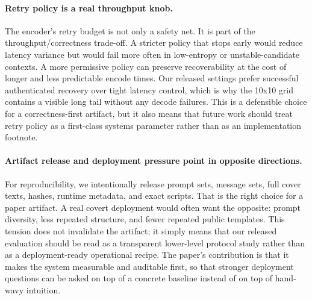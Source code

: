 \paragraph{Retry policy is a real throughput knob.} The encoder's retry budget is not only a safety net. It is part of the throughput/correctness trade-off. A stricter policy that stops early would reduce latency variance but would fail more often in low-entropy or unstable-candidate contexts. A more permissive policy can preserve recoverability at the cost of longer and less predictable encode times. Our released settings prefer successful authenticated recovery over tight latency control, which is why the 10x10 grid contains a visible long tail without any decode failures. This is a defensible choice for a correctness-first artifact, but it also means that future work should treat retry policy as a first-class systems parameter rather than as an implementation footnote.

\paragraph{Artifact release and deployment pressure point in opposite directions.} For reproducibility, we intentionally release prompt sets, message sets, full cover texts, hashes, runtime metadata, and exact scripts. That is the right choice for a paper artifact. A real covert deployment would often want the opposite: prompt diversity, less repeated structure, and fewer repeated public templates. This tension does not invalidate the artifact; it simply means that our released evaluation should be read as a transparent lower-level protocol study rather than as a deployment-ready operational recipe. The paper's contribution is that it makes the system measurable and auditable first, so that stronger deployment questions can be asked on top of a concrete baseline instead of on top of hand-wavy intuition.
